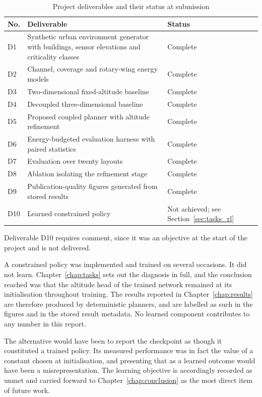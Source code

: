 \begin{table}[!ht]
\centering
\caption{Project deliverables and their status at submission}
\label{tab:deliverables}
\begin{tabular}{p{0.8cm}p{8.4cm}p{3.4cm}}
\toprule
\textbf{No.} & \textbf{Deliverable} & \textbf{Status} \\
\midrule
D1 & Synthetic urban environment generator with buildings, sensor elevations and criticality classes & Complete \\
D2 & Channel, coverage and rotary-wing energy models & Complete \\
D3 & Two-dimensional fixed-altitude baseline & Complete \\
D4 & Decoupled three-dimensional baseline & Complete \\
D5 & Proposed coupled planner with altitude refinement & Complete \\
D6 & Energy-budgeted evaluation harness with paired statistics & Complete \\
D7 & Evaluation over twenty layouts & Complete \\
D8 & Ablation isolating the refinement stage & Complete \\
D9 & Publication-quality figures generated from stored results & Complete \\
D10 & Learned constrained policy & Not achieved; see Section~\ref{sec:tasks_rl} \\
\bottomrule
\end{tabular}
\end{table}

Deliverable D10 requires comment, since it was an objective at the start of the project and is not delivered.

A constrained policy was implemented and trained on several occasions. It did not learn. Chapter~\ref{chap:tasks} sets out the diagnosis in full, and the conclusion reached was that the altitude head of the trained network remained at its initialisation throughout training. The results reported in Chapter~\ref{chap:results} are therefore produced by deterministic planners, and are labelled as such in the figures and in the stored result metadata. No learned component contributes to any number in this report.

The alternative would have been to report the checkpoint as though it constituted a trained policy. Its measured performance was in fact the value of a constant chosen at initialisation, and presenting that as a learned outcome would have been a misrepresentation. The learning objective is accordingly recorded as unmet and carried forward to Chapter~\ref{chap:conclusion} as the most direct item of future work.

